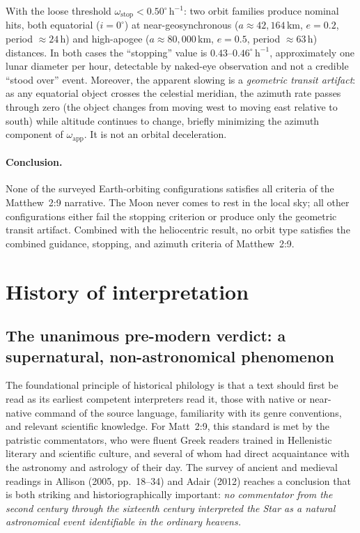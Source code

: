 \documentclass[11pt,a4paper]{article}
\begin{document}
With the loose threshold $\omega_\mathrm{stop} < 0.50^\circ\,\mathrm{h}^{-1}$:
two orbit families produce nominal hits, both equatorial ($i = 0^\circ$) at
near-geosynchronous ($a \approx 42{,}164$\,km, $e = 0.2$, period $\approx 24$\,h)
and high-apogee ($a \approx 80{,}000$\,km, $e = 0.5$, period $\approx 63$\,h)
distances. In both cases the ``stopping'' value is $0.43$--$0.46^\circ\,\mathrm{h}^{-1}$,
approximately one lunar diameter per hour, detectable by naked-eye observation
and not a credible ``stood over'' event. Moreover, the apparent slowing is a
\emph{geometric transit artifact}: as any equatorial object crosses the
celestial meridian, the azimuth rate passes through zero (the object changes
from moving west to moving east relative to south) while altitude continues to
change, briefly minimizing the azimuth component of $\omega_\mathrm{app}$.
It is not an orbital deceleration.

\paragraph{Conclusion.}
None of the surveyed Earth-orbiting configurations satisfies all criteria of
the Matthew~2:9 narrative. The Moon never comes to rest in the local sky; all
other configurations either fail the stopping criterion or produce only the
geometric transit artifact. Combined with the heliocentric result, no orbit type satisfies the combined guidance, stopping, and azimuth criteria of Matthew~2:9.

\section*{History of interpretation}

\subsection{The unanimous pre-modern verdict: a supernatural, non-astronomical phenomenon}\label{subsec:premodern}

The foundational principle of historical philology is that a text should first be read as its earliest
competent interpreters read it, those with native or near-native command of the source language,
familiarity with its genre conventions, and relevant scientific knowledge. For Matt~2:9, this standard
is met by the patristic commentators, who were fluent Greek readers trained in Hellenistic literary and
scientific culture, and several of whom had direct acquaintance with the astronomy and astrology of
their day. The survey of ancient and medieval readings in Allison (2005, pp.~18--34)\cite{allison2005}
and Adair (2012)\cite{adair2012} reaches a conclusion that is both striking and historiographically
important: \emph{no commentator from the second century through the sixteenth century interpreted
the Star as a natural astronomical event identifiable in the ordinary heavens.}
\end{document}

